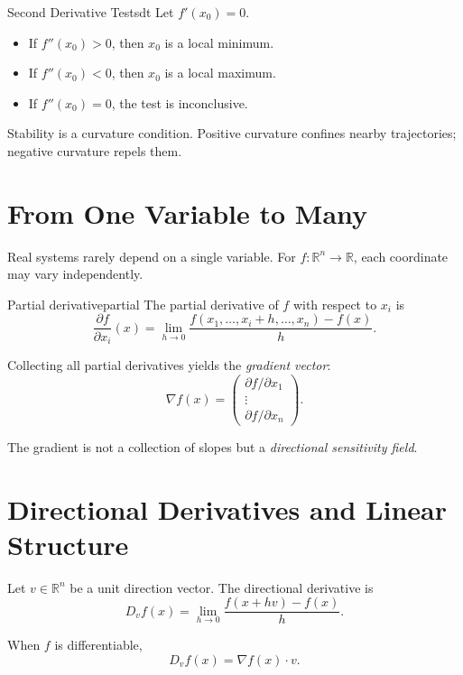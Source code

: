 \documentclass[12pt,openany]{book}
\newcommand{\R}{\mathbb{R}}
\begin{document}
\begin{theorem}{Second Derivative Test}{sdt}
  Let $f'(x_0)=0$.
  \begin{itemize}[leftmargin=1.5em]
    \item If $f''(x_0)>0$, then $x_0$ is a local minimum.
    \item If $f''(x_0)<0$, then $x_0$ is a local maximum.
    \item If $f''(x_0)=0$, the test is inconclusive.
  \end{itemize}
\end{theorem}

\begin{insight}
  Stability is a curvature condition. Positive curvature confines nearby
  trajectories; negative curvature repels them.
\end{insight}

\section{From One Variable to Many}

Real systems rarely depend on a single variable. For $f:\R^n\to\R$, each
coordinate may vary independently.

\begin{definition}{Partial derivative}{partial}
  The partial derivative of $f$ with respect to $x_i$ is
  \[
    \frac{\partial f}{\partial x_i}(x)
    = \lim_{h\to 0}
      \frac{f(x_1,\dots,x_i+h,\dots,x_n)-f(x)}{h}.
  \]
\end{definition}

Collecting all partial derivatives yields the \emph{gradient vector}:
\[
  \nabla f(x) =
  \begin{pmatrix}
    \partial f/\partial x_1 \\ \vdots \\ \partial f/\partial x_n
  \end{pmatrix}.
\]

The gradient is not a collection of slopes but a \emph{directional sensitivity
field}.

\section{Directional Derivatives and Linear Structure}

Let $v\in\R^n$ be a unit direction vector. The directional derivative is
\[
  D_v f(x) = \lim_{h\to 0}\frac{f(x+hv)-f(x)}{h}.
\]

When $f$ is differentiable,
\[
  D_v f(x) = \nabla f(x)\cdot v.
\]
\end{document}
